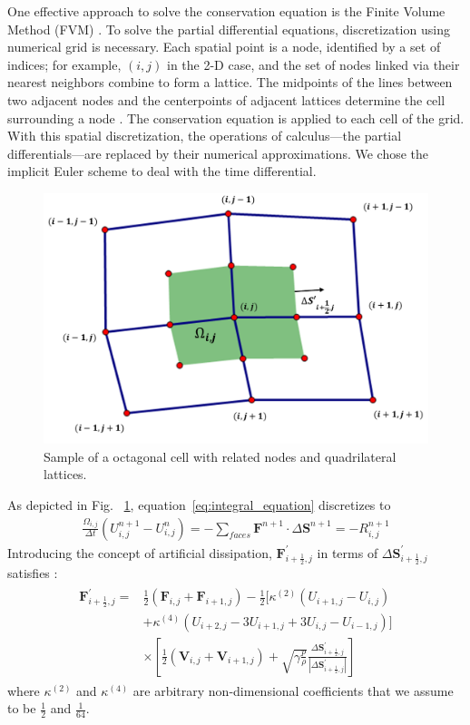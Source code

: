 \documentclass[%
 reprint,
 amsmath,amssymb,
pra,
]{revtex4-1}
\begin{document}
One effective approach to solve the conservation equation is the Finite Volume Method (FVM) \cite{eymard2000finite}. To solve the partial differential equations, discretization using numerical grid is necessary. Each spatial point is a node, identified by a set of indices; for example, $\left(i, j\right)$ in the 2-D case, and the set of nodes linked via their nearest neighbors combine to form a lattice. The midpoints of the lines between two adjacent nodes and the centerpoints of adjacent lattices determine the cell surrounding a node \cite{economon2016su2}. The conservation equation is applied to each cell of the grid. With this spatial discretization, the operations of calculus—the partial differentials—are replaced by their numerical approximations. We chose the implicit Euler scheme to deal with the time differential.

\begin{figure}[h]
	\centering  
	\includegraphics[width=0.7\linewidth]{Fig/grid}
	\caption{Sample of a octagonal cell with related nodes and quadrilateral lattices.}
	\label{fig:sample_of_cell}
\end{figure}

As depicted in Fig. ~\ref{fig:sample_of_cell}, equation~\ref{eq:integral_equation} discretizes to
\begin{align}
  \frac{\Omega_{i, j}}{\Delta t}\left(U^{n+1}_{i, j}-U^{n}_{i, j} \right) = -\sum_{faces}\bm{F}^{n+1}\cdot\Delta\bm{S}^{n+1} = -R^{n+1}_{i, j}
\end{align}
Introducing the concept of artificial dissipation, $\bm{F}^\prime_{i+\frac{1}{2}, j}$ in terms of $\Delta\bm{S}^\prime_{i+\frac{1}{2}, j}$ satisfies \cite{hirsch2007numerical} \cite{jameson1981numerical}:
\begin{align}
\begin{split}
    \bm{F}^\prime_{i+\frac{1}{2},j} =& \frac{1}{2}\left(\bm{F}_{i,j} + \bm{F}_{i+1, j}\right)
    - \frac{1}{2}\big[\kappa^{\left(2\right)}\left(U_{i+1, j}-U_{i, j}\right)\\
    &+\kappa^{\left(4\right)}\left(U_{i+2, j}-3 U_{i+1, j}+3 U_{i, j}-U_{i-1, j}\right)\big]\\
    &\times\left[\frac{1}{2}\left(\bm{V}_{i, j} + \bm{V}_{i + 1, j}\right) 
    + \sqrt{\gamma \frac{p}{\rho}}\frac{\Delta\bm{S}^\prime_{i+\frac{1}{2}, j}}
{\left|\Delta\bm{S}^\prime_{i+\frac{1}{2}, j}\right|}\right]
\end{split}
\end{align}
where $\kappa^{\left(2\right)}$ and $\kappa^{\left(4\right)}$ are arbitrary non-dimensional coefficients that we assume to be $\frac{1}{2}$ and $\frac{1}{64}$.
\end{document}
